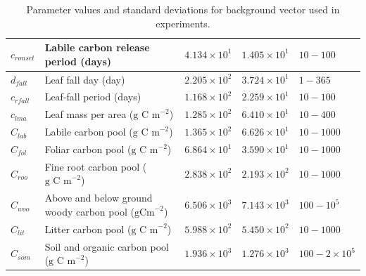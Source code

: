 \documentclass[11pt]{article}
\begin{document}
\begin{table}[ht]
\begin{center}
\begin{tabularx}{\textwidth}{| l | X | l | l | l |}
$c_{ronset}$ & Labile carbon release period (days) & $4.134\times 10^{1}$ & $1.405\times 10^{1}$ & $10 - 100$ \\ \hline
$d_{fall}$ & Leaf fall day (day) & $2.205\times 10^{2}$ & $3.724\times 10^{1}$ & $1 - 365$ \\ \hline
$c_{rfall}$ & Leaf-fall period (days) & $1.168\times 10^{2}$ & $2.259\times 10^{1}$ & $10 - 100$ \\ \hline
$c_{lma}$ & Leaf mass per area ($\text{g C m}^{-2}$) & $1.285\times 10^{2}$ & $6.410\times 10^{1}$ & $10 - 400$ \\ \hline
$C_{lab}$ & Labile carbon pool ($\text{g C m}^{-2}$) & $1.365\times 10^{2}$ & $6.626\times 10^{1}$ & $10 - 1000$ \\ \hline
$C_{fol}$ & Foliar carbon pool ($\text{g C m}^{-2}$) & $6.864\times 10^{1}$ & $3.590\times 10^{1}$ & $10 - 1000$ \\ \hline
$C_{roo}$ & Fine root carbon pool ($\text{g C m}^{-2}$) & $2.838\times 10^{2}$ & $2.193\times 10^{2}$ & $10 - 1000$ \\ \hline
$C_{woo}$ & Above and below ground woody carbon pool ($\text{gCm}^{-2}$) & $6.506\times 10^{3}$ & $7.143\times 10^{3}$ & $100 - 10^{5}$ \\ \hline
$C_{lit}$ & Litter carbon pool ($\text{g C m}^{-2}$) & $5.988\times 10^{2}$ & $5.450\times 10^{2}$ & $10 - 1000$ \\ \hline
$C_{som}$ & Soil and organic carbon pool ($\text{g C m}^{-2}$) & $1.936\times 10^{3}$ & $1.276\times 10^{3}$ & $100 - 2 \times 10^{5}$  \\ \hline
	\end{tabularx}
	\caption{Parameter values and standard deviations for background vector used in experiments.}
	\label{table:xbvars}
\end{center} 
\end{table}
\end{document}
